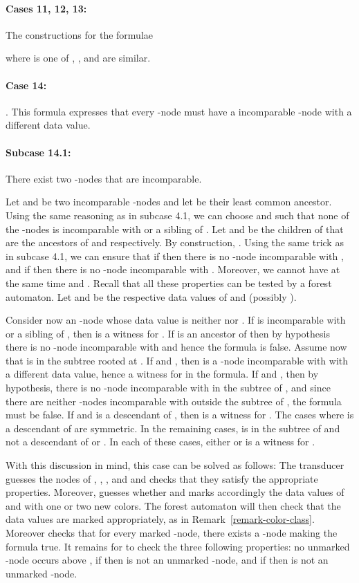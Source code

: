 \documentclass{CSML}
\begin{document}
\paragraph{\bf Cases 11, 12, 13:}
The constructions for the formulae

where  is one of , , and  
are similar.

\paragraph{\bf Case 14:}
.
This formula expresses that every -node 
must have a incomparable -node with a different data value.

\paragraph{\bf Subcase 14.1:} 
There exist two -nodes that are incomparable.

Let  and  be two incomparable -nodes and let  be their least
common ancestor. Using the same reasoning as in subcase 4.1, we can choose
 and  such that none of the -nodes is incomparable with  or a
sibling of .  Let  and  be the children of  that are the
ancestors of  and  respectively.  By construction, .
Using the same trick as in subcase 4.1,
we can ensure that if  then there is no -node
incomparable with , and
if  then there is no -node incomparable with . 
Moreover, we cannot have at the same time  and . 
Recall that all these properties can be tested by a forest automaton. 
Let  and  be the respective data values of  and  (possibly ). 

Consider now an -node  whose data value is neither  nor . 
If  is incomparable with  or a sibling of , then  is a witness for . 
If  is an ancestor of  then by hypothesis there is no -node incomparable 
with  and hence the formula is false. 
Assume now that  is in the subtree rooted at . 
If  and , then  is a -node
incomparable with  with a different data value, hence a witness for  in the formula.
If  and , 
then by hypothesis, there is no -node incomparable with 
in the subtree of , and since there are neither -nodes incomparable with 
outside the subtree of , the formula must be false.
If  and  is a descendant of , 
then  is a witness for .
The cases where  is a descendant of  are symmetric.
In the remaining cases,  is in the subtree of  
and not a descendant of  or .
In each of these cases, either  or  is a witness for .

With this discussion in mind, this case can be solved as follows:
The transducer  guesses the nodes of , , ,  and  
and checks that they satisfy the appropriate properties. 
Moreover,  guesses whether  and marks accordingly the data values 
of  and  with one or two new colors. 
The forest automaton  will then check that the data values are marked appropriately, 
as in Remark~\ref{remark-color-class}.
Moreover  checks that for every marked -node, 
there exists a -node making the formula true. 
It remains for  to check the three following properties: 
no unmarked -node occurs above ,
if  then  is not an unmarked -node,
and if  then  is not an unmarked -node.
\end{document}
